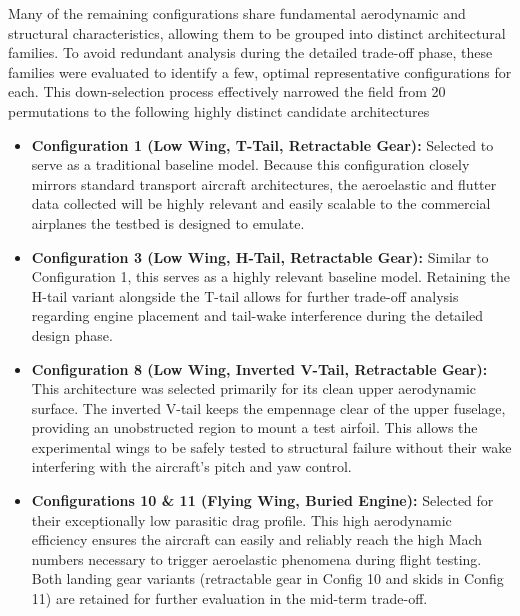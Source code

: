 Many of the remaining configurations share fundamental aerodynamic and structural characteristics, allowing them to be grouped into distinct architectural families. To avoid redundant analysis during the detailed trade-off phase, these families were evaluated to identify a few, optimal representative configurations for each. This down-selection process effectively narrowed the field from 20 permutations to the following highly distinct candidate architectures

\begin{itemize}
    \item \textbf{Configuration 1 (Low Wing, T-Tail, Retractable Gear):} Selected to serve as a traditional baseline model. Because this configuration closely mirrors standard transport aircraft architectures, the aeroelastic and flutter data collected will be highly relevant and easily scalable to the commercial airplanes the testbed is designed to emulate. 
    
    \item \textbf{Configuration 3 (Low Wing, H-Tail, Retractable Gear):} Similar to Configuration 1, this serves as a highly relevant baseline model. Retaining the H-tail variant alongside the T-tail allows for further trade-off analysis regarding engine placement and tail-wake interference during the detailed design phase.
    
    \item \textbf{Configuration 8 (Low Wing, Inverted V-Tail, Retractable Gear):} This architecture was selected primarily for its clean upper aerodynamic surface. The inverted V-tail keeps the empennage clear of the upper fuselage, providing an unobstructed region to mount a test airfoil. This allows the experimental wings to be safely tested to structural failure without their wake interfering with the aircraft's pitch and yaw control.
    
    \item \textbf{Configurations 10 \& 11 (Flying Wing, Buried Engine):} Selected for their exceptionally low parasitic drag profile. This high aerodynamic efficiency ensures the aircraft can easily and reliably reach the high Mach numbers necessary to trigger aeroelastic phenomena during flight testing. Both landing gear variants (retractable gear in Config 10 and skids in Config 11) are retained for further evaluation in the mid-term trade-off.
\end{itemize}




